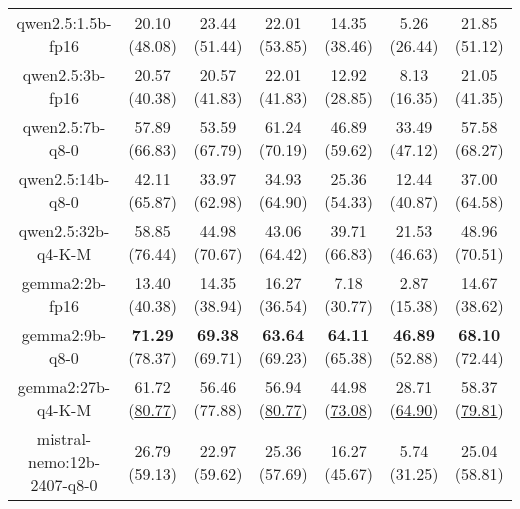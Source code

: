 \begin{table}[hbp]
{\begin{tabular}{ccccccc}
        \multicolumn{1}{c|}{qwen2.5:1.5b-fp16} & 20.10 (48.08) & 23.44 (51.44) & \multicolumn{1}{c|}{22.01 (53.85)} & 14.35 (38.46) & \multicolumn{1}{c|}{5.26 (26.44)} & 21.85 (51.12) \\
        

        \multicolumn{1}{c|}{qwen2.5:3b-fp16} & 20.57 (40.38) & 20.57 (41.83) & \multicolumn{1}{c|}{22.01 (41.83)} & 12.92 (28.85) & \multicolumn{1}{c|}{8.13 (16.35)} & 21.05 (41.35) \\
        

        \multicolumn{1}{c|}{qwen2.5:7b-q8-0} & 57.89 (66.83) & 53.59 (67.79) & \multicolumn{1}{c|}{61.24 (70.19)} & 46.89 (59.62) & \multicolumn{1}{c|}{33.49 (47.12)} & 57.58 (68.27) \\
        

        \multicolumn{1}{c|}{qwen2.5:14b-q8-0} & 42.11 (65.87) & 33.97 (62.98) & \multicolumn{1}{c|}{34.93 (64.90)} & 25.36 (54.33) & \multicolumn{1}{c|}{12.44 (40.87)} & 37.00 (64.58) \\
        

        \multicolumn{1}{c|}{qwen2.5:32b-q4-K-M} & 58.85 (76.44) & 44.98 (70.67) & \multicolumn{1}{c|}{43.06 (64.42)} & 39.71 (66.83) & \multicolumn{1}{c|}{21.53 (46.63)} & 48.96 (70.51) \\
        

        \multicolumn{1}{c|}{gemma2:2b-fp16} & 13.40 (40.38) & 14.35 (38.94) & \multicolumn{1}{c|}{16.27 (36.54)} & 7.18 (30.77) & \multicolumn{1}{c|}{2.87 (15.38)} & 14.67 (38.62) \\
        

        \multicolumn{1}{c|}{gemma2:9b-q8-0} & \textbf{71.29} (78.37) & \textbf{69.38} (69.71) & \multicolumn{1}{c|}{\textbf{63.64} (69.23)} & \textbf{64.11} (65.38) & \multicolumn{1}{c|}{\textbf{46.89} (52.88)} & \textbf{68.10} (72.44) \\
        

        \multicolumn{1}{c|}{gemma2:27b-q4-K-M} & 61.72 (\underline{80.77}) & 56.46 (77.88) & \multicolumn{1}{c|}{56.94 (\underline{80.77})} & 44.98 (\underline{73.08}) & \multicolumn{1}{c|}{28.71 (\underline{64.90})} & 58.37 (\underline{79.81}) \\
        

        \multicolumn{1}{c|}{mistral-nemo:12b-2407-q8-0} & 26.79 (59.13) & 22.97 (59.62) & \multicolumn{1}{c|}{25.36 (57.69)} & 16.27 (45.67) & \multicolumn{1}{c|}{5.74 (31.25)} & 25.04 (58.81) \\
        

\end{tabular}}
\end{table}
